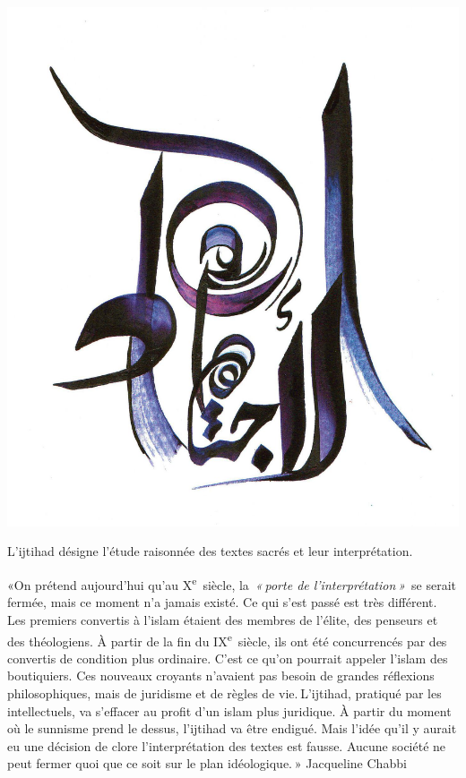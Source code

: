 \includegraphics[width=\textwidth]{Images/image009.png}

\begin{Def}[iǧtihād]
L'ijtihad désigne l'étude raisonnée des textes sacrés et leur
interprétation.
\end{Def}
\begin{cite}
«On prétend aujourd'hui qu'au
X\textsuperscript{e}~siècle, la~\emph{« porte de l'interprétation »}~se
serait fermée, mais ce moment n'a jamais existé. Ce qui s'est passé est
très différent. Les premiers convertis à l'islam étaient des membres de
l'élite, des penseurs et des théologiens. À partir de la fin du
IX\textsuperscript{e}~siècle, ils ont été concurrencés par des convertis
de condition plus ordinaire. C'est ce qu'on pourrait appeler l'islam des
boutiquiers. Ces nouveaux croyants n'avaient pas besoin de grandes
réflexions philosophiques, mais de juridisme et de règles de
vie. L'ijtihad, pratiqué par les intellectuels, va s'effacer au profit
d'un islam plus juridique. À partir du moment où le sunnisme prend le
dessus, l'ijtihad va être endigué. Mais l'idée qu'il y aurait eu une
décision de clore l'interprétation des textes est fausse. Aucune société
ne peut fermer quoi que ce soit sur le plan idéologique. » Jacqueline Chabbi
\end{cite}


